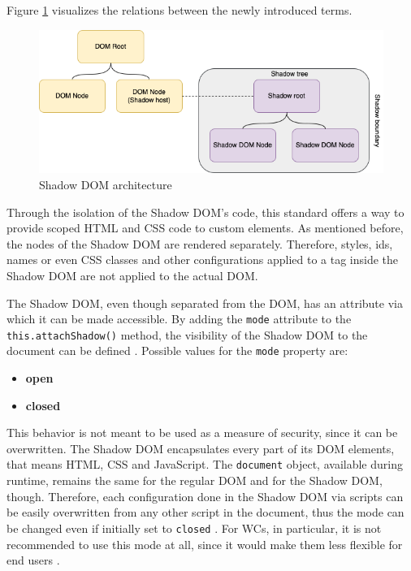\newpage
Figure \ref{fig:shadow_dom} visualizes the relations between the newly introduced terms.

\begin{figure}[!h]
	\centering
	\includegraphics[width=1\textwidth]{Figures/shadow_dom.drawio.png}
	\caption{Shadow DOM architecture}
	\label{fig:shadow_dom}
\end{figure}

Through the isolation of the Shadow DOM's code, this standard offers a way to provide scoped HTML and CSS code to custom elements. As mentioned before, the nodes of the Shadow DOM are rendered separately. Therefore, styles, ids, names or even CSS classes and other configurations applied to a tag inside the Shadow DOM are not applied to the actual DOM.

The Shadow DOM, even though separated from the DOM, has an attribute via which it can be made accessible. By adding the \texttt{mode} attribute to the \texttt{this.attachShadow()} method, the visibility of the Shadow DOM to the document can be defined \cite{simon_thesis}. Possible values for the \texttt{mode} property are:

\begin{itemize}[noitemsep]
	\item \textbf{open}
	\item \textbf{closed}
\end{itemize}

This behavior is not meant to be used as a measure of security, since it can be overwritten. The Shadow DOM encapsulates every part of its DOM elements, that means HTML, CSS and JavaScript. The \texttt{document} object, available during runtime, remains the same for the regular DOM and for the Shadow DOM, though. Therefore, each configuration done in the Shadow DOM via scripts can be easily overwritten from any other script in the document, thus the mode can be changed even if initially set to \texttt{closed} \cite{shadow_dom_encapsulation}. For WCs, in particular, it is not recommended to use this mode at all, since it would make them less flexible for end users \cite{wc_shadow_dom_google}.

